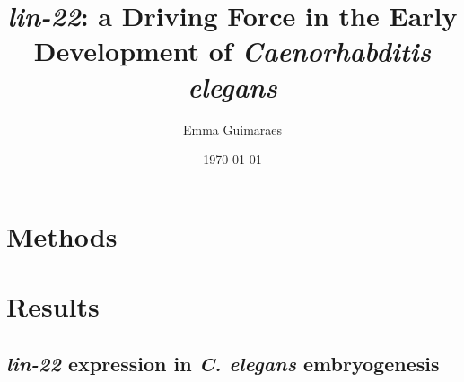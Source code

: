 \documentclass{article}[12pt]
\title{\emph{lin-22}: a Driving Force in the Early Development of \textit{Caenorhabditis elegans}}
\author{Emma Guimaraes}
\date{\today}
\begin{document}
\maketitle
\tableofcontents
\newpage

\section{Methods}

\subsection{}

\section{Results}

\subsection{\emph{lin-22} expression in \emph{C. elegans} embryogenesis}






\printbibliography
\end{document}
